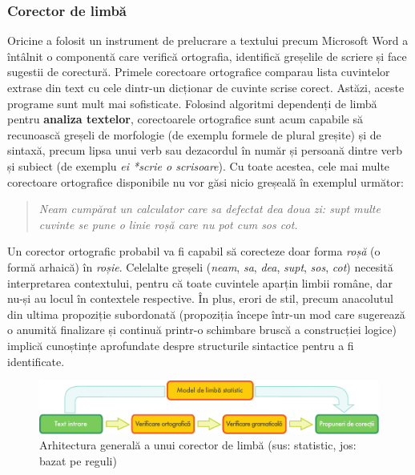 \begin{multicols}{2}
\subsubsection{Corector de limbă}
Oricine a folosit un instrument de prelucrare a textului precum Microsoft Word a întâlnit o componentă care verifică ortografia, identifică greșelile de scriere și face sugestii de corectură. Primele corectoare ortografice comparau lista cuvintelor extrase din text cu cele \mbox{dintr-un} dicționar de cuvinte scrise corect. Astăzi, aceste programe sunt mult mai sofisticate. Folosind algoritmi dependenți de limbă pentru \textbf{analiza textelor}, corectoarele ortografice sunt acum capabile să recunoască greșeli de morfologie (de exemplu formele de plural greșite) și de sintaxă, precum lipsa unui verb sau dezacordul în număr și persoană dintre verb și subiect (de exemplu \textit{ei *scrie o scrisoare}). Cu toate acestea, cele mai multe corectoare ortografice disponibile nu vor găsi nicio greșeală în exemplul următor:
 
\begin{quote}
\textit{Neam cumpărat un calculator care sa defectat dea doua zi: supt multe cuvinte se pune o linie roșă care nu pot cum sos cot.}\end{quote}

Un corector ortografic probabil va fi capabil să corecteze doar forma \textit{roșă} (o formă arhaică) în \textit{roșie}. Celelalte greșeli (\textit{neam}, \textit{sa}, \textit{dea}, \textit{supt}, \textit{sos}, \textit{cot}) necesită interpretarea contextului, pentru că toate cuvintele aparțin limbii române, dar nu-și au locul în contextele respective. În plus, erori de stil, precum anacolutul din ultima propoziție subordonată (propoziția începe \mbox{într-un} mod care sugerează o anumită finalizare și continuă \mbox{printr-o} schimbare bruscă a construcției logice) implică cunoștințe aprofundate despre structurile sintactice pentru a fi identificate.

\begin{figure}[htb]
\center
\includegraphics[width=\textwidth]{../_media/romanian/language_checking}
\caption{Arhitectura generală a unui corector de limbă (sus: statistic, jos: bazat pe reguli)}
\label{fig:langcheckingaarch_ro}
\vspace{-15mm}
\end{figure}


\end{multicols}
